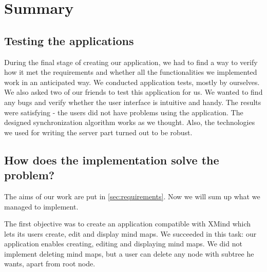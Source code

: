 %
%
%
%
%

\chapter{Summary}
\label{chap:summary}

\section{Testing the applications}
\label{sec:summary-testing}
During the final stage of creating our application, we had to find a way to verify how it met the requirements and whether all the functionalities we implemented work in an anticipated way. We conducted application tests, mostly by ourselves. We also asked two of our friends to test this application for us. We wanted to find any bugs and verify whether the user interface is intuitive and handy. The results were satisfying - the users did not have problems using the application. The designed synchronization algorithm works as we thought. Also, the technologies we used for writing the server part turned out to be robust.

\section{How does the implementation solve the problem?}
\label{sec:summary-how-solve}
The aims of our work are put in \cref{sec:requirements}. Now we will sum up what we managed to implement. 
 
The first objective was to create an application compatible with XMind which lets its users create, edit and display mind maps. We succeeded in this task: our application enables creating, editing and displaying mind maps. We did not implement deleting mind maps, but a user can delete any node with subtree he wants, apart from root node.

